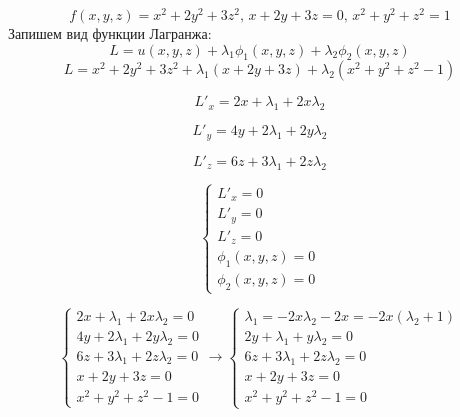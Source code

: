 \documentclass[a5paper, 10pt]{article}
\theoremstyle{definition}
\theoremstyle{plain}
\theoremstyle{remark}
\begin{document}
\begin{equation}
f(x, y, z) = x^2+2y^2+3z^2, \, x + 2y+3z=0, \, x^2 +y^2+z^2=1
\end{equation}
Запишем вид функции Лагранжа:
\begin{equation}
L = u(x, y, z) + \lambda_1 \phi_1 (x, y, z) + \lambda_2 \phi_2 (x, y, z)
\end{equation}
\begin{equation}
L =  x^2+2y^2+3z^2 + \lambda_1 ( x + 2y+3z) + \lambda_2 (x^2 +y^2+z^2 - 1)
\end{equation}

\begin{equation}
L'_x =  2x+ \lambda_1  + 2x \lambda_2
\end{equation}

\begin{equation}
L'_y = 4y + 2\lambda_1  + 2y \lambda_2 
\end{equation}

\begin{equation}
L'_z =  6z +3 \lambda_1 + 2z \lambda_2 
\end{equation}

\begin{equation}
\begin{cases}
L'_x = 0\\
L'_y = 0\\
L'_z = 0\\
\phi_1 (x, y, z) = 0\\
\phi_2 (x, y, z) = 0
\end{cases}
\end{equation}

\begin{equation}
\begin{cases}
 2x+ \lambda_1  + 2x \lambda_2 = 0\\
4y + 2\lambda_1  + 2y \lambda_2  = 0\\
6z +3 \lambda_1 + 2z \lambda_2  = 0\\
 x + 2y+3z = 0\\
x^2 +y^2+z^2 - 1 = 0
\end{cases}
\to
\begin{cases}
 \lambda_1  = -2x \lambda_2 -2x = -2x(\lambda_2 + 1)\\
2y + \lambda_1  + y \lambda_2  = 0\\
6z +3 \lambda_1 + 2z \lambda_2  = 0\\
 x + 2y+3z = 0\\
x^2 +y^2+z^2 - 1 = 0
\end{cases}
\end{equation}
\end{document}
